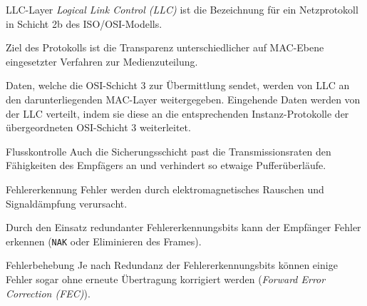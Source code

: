 \begin{defi}{LLC-Layer}
    \emph{Logical Link Control (LLC)} ist die Bezeichnung für ein Netzprotokoll in Schicht 2b des ISO/OSI-Modells.

    Ziel des Protokolls ist die Transparenz unterschiedlicher auf MAC-Ebene eingesetzter Verfahren zur Medienzuteilung.

    Daten, welche die OSI-Schicht 3 zur Übermittlung sendet, werden von LLC an den darunterliegenden MAC-Layer weitergegeben.
    Eingehende Daten werden von der LLC verteilt, indem sie diese an die entsprechenden Instanz-Protokolle der übergeordneten OSI-Schicht 3 weiterleitet.
\end{defi}

\begin{bonus}{Flusskontrolle}
    Auch die Sicherungsschicht past die Transmissionsraten den Fähigkeiten des Empfägers an und verhindert so etwaige Pufferüberläufe.
\end{bonus}

\begin{bonus}{Fehlererkennung}
    Fehler werden durch elektromagnetisches Rauschen und Signaldämpfung verursacht.

    Durch den Einsatz redundanter Fehlererkennungsbits kann der Empfänger Fehler erkennen (\texttt{NAK} oder Eliminieren des Frames).
\end{bonus}

\begin{bonus}{Fehlerbehebung}
    Je nach Redundanz der Fehlererkennungsbits können einige Fehler sogar ohne erneute Übertragung korrigiert werden (\emph{Forward Error Correction (FEC)}).
\end{bonus}